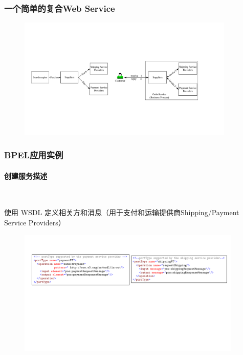 \subsubsection{一个简单的复合Web Service}
\begin{figure}[H]
    \vspace{-0.7em}
	\centering
	\includegraphics[width=0.92\textwidth]{images/一个简单的复合Web Service.pdf}
    \vspace{-1.5em}
\end{figure}

\subsubsection{BPEL应用实例}
\paragraph*{创建服务描述}~{} \par
使用 WSDL 定义相关方和消息（用于支付和运输提供商Shipping/Payment Service Providers）
\begin{figure}[H]
    \vspace{-0.7em}
	\centering
	\includegraphics[width=0.95\textwidth]{images/创建服务描述.pdf}
    \vspace{-1.5em}
\end{figure}

